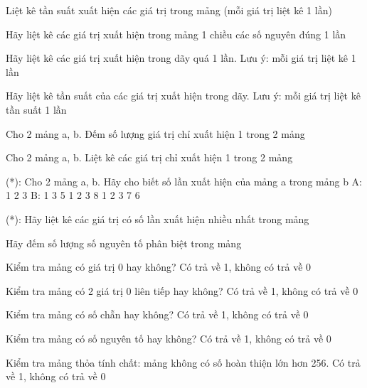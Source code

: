 \begin{problem}
    Liệt kê tần suất xuất hiện các giá trị trong mảng (mỗi giá trị liệt kê 1 lần)
\end{problem}
\begin{problem}
    Hãy liệt kê các giá trị xuất hiện trong mảng 1 chiều các số nguyên đúng 1 lần
\end{problem}
\begin{problem}
    Hãy liệt kê các giá trị xuất hiện trong dãy quá 1 lần. Lưu ý: mỗi giá trị liệt kê 1 lần
\end{problem}
\begin{problem}
    Hãy liệt kê tần suất của các giá trị xuất hiện trong dãy. Lưu ý: mỗi giá trị liệt kê tần suất 1 lần
\end{problem}
\begin{problem}
    Cho 2 mảng a, b. Đếm số lượng giá trị chỉ xuất hiện 1 trong 2 mảng
\end{problem}
\begin{problem}
    Cho 2 mảng a, b. Liệt kê các giá trị chỉ xuất hiện 1 trong 2 mảng
\end{problem}
\begin{problem}
    (*): Cho 2 mảng a, b. Hãy cho biết số lần xuất hiện của mảng a trong mảng b A: 1 2 3  B:  1 3 5 1 2 3 8 1 2 3 7 6
\end{problem}
\begin{problem}
    (*): Hãy liệt kê các giá trị có số lần xuất hiện nhiều nhất trong mảng
\end{problem}
\begin{problem}
    Hãy đếm số lượng số nguyên tố phân biệt trong mảng
\end{problem}
\begin{problem}
    Kiểm tra mảng có giá trị 0 hay không? Có trả về 1, không có trả về 0
\end{problem}
\begin{problem}
    Kiểm tra mảng có 2 giá trị 0 liên tiếp hay không? Có trả về 1, không có trả về 0
\end{problem}
\begin{problem}
    Kiểm tra mảng có số chẵn hay không? Có trả về 1, không có trả về 0
\end{problem}
\begin{problem}
    Kiểm tra mảng có số nguyên tố hay không? Có trả về 1, không có trả về 0
\end{problem}
\begin{problem}
    Kiểm tra mảng thỏa tính chất: mảng không có số hoàn thiện lớn hơn 256. Có trả về 1, không có trả về 0
\end{problem}
